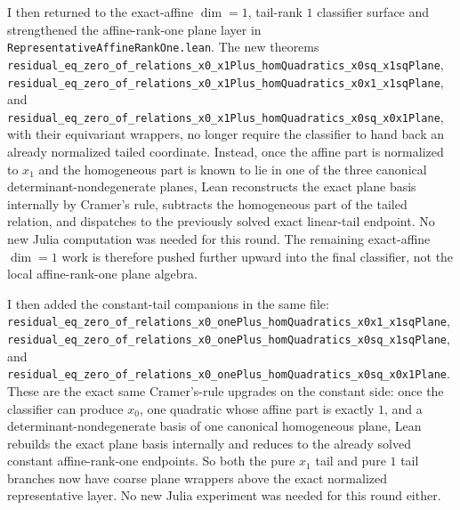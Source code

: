 \documentclass[11pt]{article}
\begin{document}
I then returned to the exact-affine \(\dim=1\), tail-rank \(1\) classifier
surface and strengthened the affine-rank-one plane layer in
\texttt{RepresentativeAffineRankOne.lean}. The new theorems
\texttt{residual\_eq\_zero\_of\_relations\_x0\_x1Plus\_homQuadratics\_x0sq\_x1sqPlane},
\texttt{residual\_eq\_zero\_of\_relations\_x0\_x1Plus\_homQuadratics\_x0x1\_x1sqPlane},
and
\texttt{residual\_eq\_zero\_of\_relations\_x0\_x1Plus\_homQuadratics\_x0sq\_x0x1Plane},
with their equivariant wrappers, no longer require the classifier to hand back
an already normalized tailed coordinate. Instead, once the affine part is
normalized to \(x_1\) and the homogeneous part is known to lie in one of the
three canonical determinant-nondegenerate planes, Lean reconstructs the exact
plane basis internally by Cramer's rule, subtracts the homogeneous part of the
tailed relation, and dispatches to the previously solved exact linear-tail
endpoint. No new Julia computation was needed for this round. The remaining
exact-affine \(\dim=1\) work is therefore pushed further upward into the final
classifier, not the local affine-rank-one plane algebra.

I then added the constant-tail companions in the same file:
\texttt{residual\_eq\_zero\_of\_relations\_x0\_onePlus\_homQuadratics\_x0x1\_x1sqPlane},
\texttt{residual\_eq\_zero\_of\_relations\_x0\_onePlus\_homQuadratics\_x0sq\_x1sqPlane},
and
\texttt{residual\_eq\_zero\_of\_relations\_x0\_onePlus\_homQuadratics\_x0sq\_x0x1Plane}.
These are the exact same Cramer's-rule upgrades on the constant side: once the
classifier can produce \(x_0\), one quadratic whose affine part is exactly
\(1\), and a determinant-nondegenerate basis of one canonical homogeneous
plane, Lean rebuilds the exact plane basis internally and reduces to the
already solved constant affine-rank-one endpoints. So both the pure \(x_1\)
tail and pure \(1\) tail branches now have coarse plane wrappers above the
exact normalized representative layer. No new Julia experiment was needed for
this round either.
\end{document}
